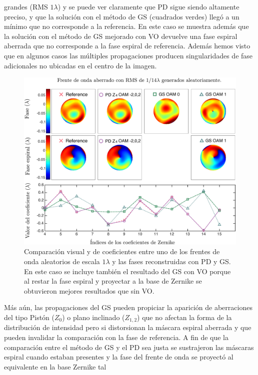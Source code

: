 grandes (RMS $1\lambda$) y se puede ver claramente que PD sigue siendo
altamente preciso, y que la solución
con el método de GS (cuadrados verdes) llegó a un mínimo que no
corresponde a la referencia. En este caso se muestra además que la
solución con el método de GS mejorado con VO devuelve una fase espiral
aberrada que no corresponde a la fase espiral de referencia. Además hemos
visto que en algunos casos las múltiples propagaciones
producen singularidades de fase adicionales no ubicadas en el centro
de la imagen. 
\begin{figure}[h!]
\centering
\includegraphics[scale=.3]{phase_comparison_esp_2.pdf}
\caption[Resultados visuales de simulaciones de PD coherente para
aberración $1\lambda$]{Comparación visual y de coeficientes entre uno de los frentes
  de onda aleatorios de escala $1\lambda$ y las fases reconstruidas
  con PD y GS. En este caso se incluye también el resultado del GS con
VO porque al restar la fase espiral y proyectar a la base de Zernike
se obtuvieron mejores resultados que sin VO.} 
\label{fig:visual_comparison}
\end{figure}
Más aún, las propagaciones del GS pueden propiciar la aparición de
aberraciones del tipo Pistón ($Z_0$) o plano inclinado
($Z_{1,2}$) que no afectan la forma de la distribución de intensidad
pero si distorsionan la máscara espiral aberrada y que 
pueden invalidar la comparación con la fase de referencia. 
A fin de que la comparación entre el método de GS y el PD sea justa se
sustrajeron las máscaras espiral cuando estaban presentes y la fase
del frente de onda se proyectó al equivalente en la  base Zernike tal
